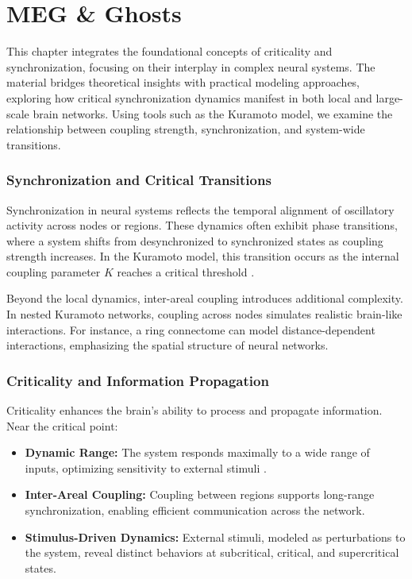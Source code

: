 
\section{MEG \& Ghosts}


This chapter integrates the foundational concepts of criticality and synchronization, focusing on their interplay in complex neural systems. The material bridges theoretical insights with practical modeling approaches, exploring how critical synchronization dynamics manifest in both local and large-scale brain networks. Using tools such as the Kuramoto model, we examine the relationship between coupling strength, synchronization, and system-wide transitions.

\subsubsection*{Synchronization and Critical Transitions}

Synchronization in neural systems reflects the temporal alignment of oscillatory activity across nodes or regions. These dynamics often exhibit phase transitions, where a system shifts from desynchronized to synchronized states as coupling strength increases. In the Kuramoto model, this transition occurs as the internal coupling parameter \( K \) reaches a critical threshold \cite{strogatz2000kuramoto}. 

Beyond the local dynamics, inter-areal coupling introduces additional complexity. In nested Kuramoto networks, coupling across nodes simulates realistic brain-like interactions. For instance, a ring connectome can model distance-dependent interactions, emphasizing the spatial structure of neural networks. 

\subsubsection*{Criticality and Information Propagation}

Criticality enhances the brain's ability to process and propagate information. Near the critical point: 
\begin{itemize}
    \item \textbf{Dynamic Range:} The system responds maximally to a wide range of inputs, optimizing sensitivity to external stimuli \cite{kinouchi2006optimal}.
    \item \textbf{Inter-Areal Coupling:} Coupling between regions supports long-range synchronization, enabling efficient communication across the network.
    \item \textbf{Stimulus-Driven Dynamics:} External stimuli, modeled as perturbations to the system, reveal distinct behaviors at subcritical, critical, and supercritical states.
\end{itemize}

